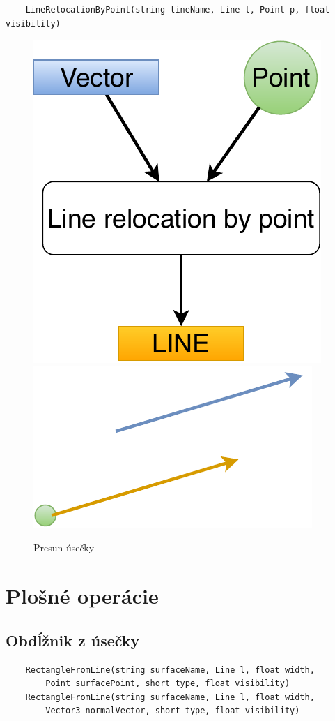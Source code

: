 \begin{lstlisting}
	LineRelocationByPoint(string lineName, Line l, Point p, float visibility)
\end{lstlisting}


\begin{figure}[H]
	\centering
	\includegraphics[height=0.3\textwidth]{obrazky-figures/Diagram/Line/DP Navrh operacii-1D - LineRelocation.pdf}
	\includegraphics[height=0.3\textwidth]{obrazky-figures/Diagram/Draw/2Line/DP Navrh operacii-1D - LineRelocation.pdf}
	\caption{Presun úsečky}
	\label{fig:1}
\end{figure}






\section{Plošné operácie}


\subsection{Obdĺžnik z úsečky}

\begin{lstlisting}
	RectangleFromLine(string surfaceName, Line l, float width,
	    Point surfacePoint, short type, float visibility)
	RectangleFromLine(string surfaceName, Line l, float width,
	    Vector3 normalVector, short type, float visibility)
\end{lstlisting}

